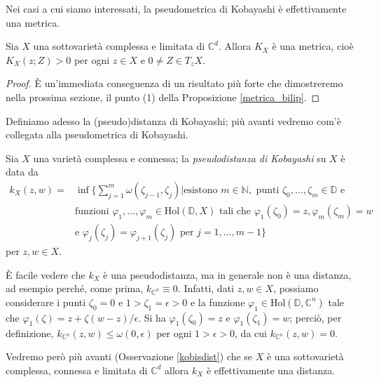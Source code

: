 Nei casi a cui siamo interessati, la pseudometrica di Kobayashi è effettivamente una metrica.

\begin{prop}
    Sia $X$ una sottovarietà complessa e limitata di $\mathbb{C}^d$. Allora $K_X$ è una metrica, cioè $K_X(z;Z)>0$ per ogni $z\in X$ e $0\not=Z\in T_zX$.
\end{prop}

\begin{proof}
    È un'immediata conseguenza di un risultato più forte che dimostreremo nella prossima sezione, il punto (1) della Proposizione \ref{metrica_bilip}.
\end{proof}

Definiamo adesso la (pseudo)distanza di Kobayashi; più avanti vedremo com'è collegata alla pseudometrica di Kobayashi.

\begin{defn}
    Sia $X$ una varietà complessa e connessa; la \textit{pseudodistanza di Kobayashi} su $X$ è data da
    \begin{equation}\begin{split}
        k_X(z,w)=&\inf\Bigg\{\sum_{j=1}^m \omega(\zeta_{j-1},\zeta_j) \bigg\vert \text{esistono }m\in\mathbb{N},\text{ punti }\zeta_0,\dots,\zeta_m \in \mathbb{D}\text{ e}\\
        &\text{funzioni }\varphi_1,\dots,\varphi_m\in\text{Hol}(\mathbb{D},X) \text{ tali che } \varphi_1(\zeta_0)=z,\varphi_m(\zeta_m)=w\\
        &\text{e }\varphi_j(\zeta_j)=\varphi_{j+1}(\zeta_j)\text{ per }j=1,\dots,m-1\Bigg\}
    \end{split}\end{equation}
    per $z,w \in X$.
\end{defn}

\begin{oss} \label{k_lip}
    È facile vedere che $k_X$ è una pseudodistanza, ma in generale non è una distanza, ad esempio perché, come prima, $k_{\mathbb{C}^n}\equiv 0$. Infatti, dati $z,w\in X$, possiamo considerare i punti $\zeta_0=0$ e $1>\zeta_1=\epsilon>0$ e la funzione $\varphi_1\in\text{Hol}(\mathbb{D},\mathbb{C}^n)$ tale che $\varphi_1(\zeta)=z+\zeta(w-z)/\epsilon$. Si ha $\varphi_1(\zeta_0)=z$ e $\varphi_1(\zeta_1)=w$; perciò, per definizione, $k_{\mathbb{C}^n}(z,w) \le \omega(0,\epsilon)$ per ogni $1>\epsilon>0$, da cui $k_{\mathbb{C}^n}(z,w)=0$.
    
    Vedremo però più avanti (Osservazione \ref{kobisdist}) che se $X$ è una sottovarietà complessa, connessa e limitata di $\mathbb{C}^d$ allora $k_X$ è effettivamente una distanza.
\end{oss}

